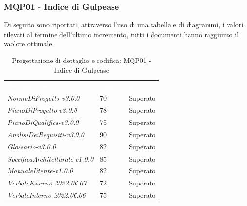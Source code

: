 \subsubsection{MQP01 - Indice di Gulpease}
Di seguito sono riportati, attraverso l'uso di una tabella e di diagrammi, i valori rilevati al termine dell'ultimo incremento, tutti i documenti hanno raggiunto il vaolore ottimale.
\begin{table}[H]
        \renewcommand{\arraystretch}{1.5}
        \begin{tabular}{m{}<{\centering}  m{}<{\centering}  m{}<{\centering} }
            \rowcolor{darkblue}
            \textcolor{white}{\textbf{Documento}}& \textcolor{white}{\textbf{Valore}} & \textcolor{white}{\textbf{Esito}}\\ 

            \textit{NormeDiProgetto-v3.0.0} &
            70 &
            Superato \\

            \textit{PianoDiProgetto-v3.0.0} &
            78 &
            Superato \\

            \textit{PianoDiQualifica-v3.0.0} &
            75 &
            Superato \\

            \textit{AnalisiDeiRequisiti-v3.0.0} &
            90 &
            Superato \\
            
            \textit{Glossario-v3.0.0} &
            82 &
            Superato \\
            \textit{SpecificaArchitetturale-v1.0.0} &
            85 &
            Superato \\
            \textit{ManualeUtente-v1.0.0} &
            82 &
            Superato \\

            \textit{VerbaleEsterno-2022.06.07} &
            72 &
            Superato \\
          
            \textit{VerbaleInterno-2022.06.06} &
            75&
            Superato \\
    \end{tabular}
    \caption{Progettazione di dettaglio e codifica: MQP01 - Indice di Gulpease}
\end{table}
